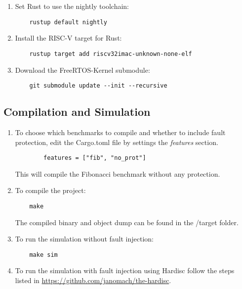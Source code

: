 \documentclass[12pt, letterpaper, slovak]{article}
\begin{document}
\begin{appendices}
\begin{enumerate}
    \item Set Rust to use the nightly toolchain:
    \begin{verbatim}
    rustup default nightly
    \end{verbatim}

    \item Install the RISC-V target for Rust:
    \begin{verbatim}
    rustup target add riscv32imac-unknown-none-elf
    \end{verbatim}

    \item Download the FreeRTOS-Kernel submodule:
    \begin{verbatim}
    git submodule update --init --recursive
    \end{verbatim}
\end{enumerate}

\subsection{Compilation and Simulation}

\begin{enumerate}
    \item To choose which benchmarks to compile and whether to include fault protection, edit the Cargo.toml file by settings the \textit{features} section.
    \begin{verbatim}
        features = ["fib", "no_prot"]
    \end{verbatim}
    This will compile the Fibonacci benchmark without any protection.
    \item To compile the project:
    \begin{verbatim}
    make
    \end{verbatim}
    The compiled binary and object dump can be found in the /target folder.

    \item To run the simulation without fault injection:
    \begin{verbatim}
    make sim
    \end{verbatim}

    \item To run the simulation with fault injection using Hardisc follow the steps listed in \url{https://github.com/janomach/the-hardisc}.
\end{enumerate}


\end{appendices}
\end{document}
